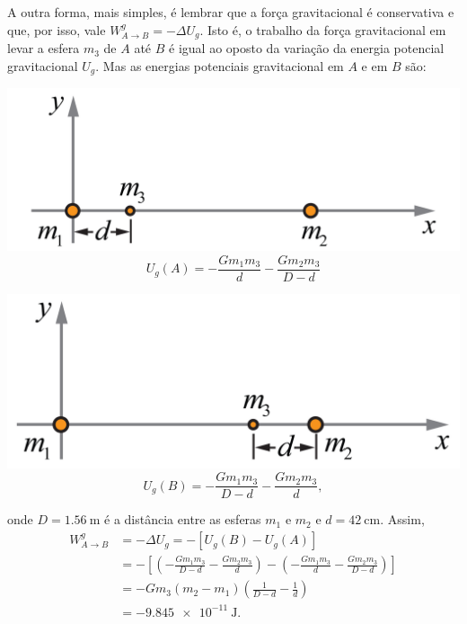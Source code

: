\documentclass[a4paper]{article}
\begin{document}
\begin{resolucoes}
\begin{exercicio}
\begin{compactenum}[(a)]
  A outra forma, mais simples, é lembrar que a força gravitacional é conservativa e que, por isso, vale $W_{A\to B}^{g} = -\Delta U_g$.
  Isto é, o trabalho da força gravitacional em levar a esfera $m_3$ de $A$ até $B$ é igual ao oposto da variação da energia potencial gravitacional $U_g$.
  Mas as energias potenciais gravitacional em $A$ e em $B$ são:
  
  \begin{minipage}{0.45\textwidth}
  \includegraphics[width=\textwidth]{A}  
  \begin{equation*}
  U_g(A) = -\frac{Gm_1m_3}{d} -\frac{Gm_2m_3}{D-d}
  \end{equation*}
  \end{minipage}\hfill
  \begin{minipage}{0.45\textwidth}
  \includegraphics[width=\textwidth]{B}  
  \begin{equation*}
  U_g(B) = -\frac{Gm_1m_3}{D-d} -\frac{Gm_2m_3}{d},
  \end{equation*}
  \end{minipage} 
  
  \medskip
  
  \noindent
  onde $D = \SI{1.56}{\metre}$ é a distância entre as esferas $m_1$ e $m_2$ e $d = \SI{42}{\centi\metre}$.
  Assim,
  \begin{align*}
  W_{A\to B}^{g} &= -\Delta U_g = -\left[U_g(B) - U_g(A)\right]\\
                 &= -\left[\left(-\frac{Gm_1m_3}{D-d} -\frac{Gm_2m_3}{d}\right) -\left(-\frac{Gm_1m_3}{d} -\frac{Gm_2m_3}{D-d}\right)\right]\\
                 &= -Gm_3(m_2-m_1)\left(\frac{1}{D-d}-\frac{1}{d}\right)\\
                 &= -\SI{9.845e-11}{\joule}.
  \end{align*}


\end{compactenum}
\end{exercicio}
\end{resolucoes}
\end{document}
